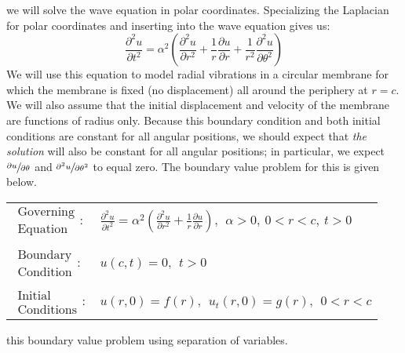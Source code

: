  we will solve the wave equation in polar coordinates.  Specializing the Laplacian for polar coordinates and inserting into the wave equation gives us:
\begin{equation}
\frac{\partial^2 u}{\partial t^2} = \alpha^2 \left(\frac{\partial^2 u}{\partial r^2} + \frac{1}{r}\frac{\partial u}{\partial r} + \frac{1}{r^2}\frac{\partial^2 u}{\partial \theta^2} \right)
\label{eq:lec31-wave-eqn-polar}
\end{equation}
We will use this equation to model radial vibrations in a circular membrane for which the membrane is fixed (no displacement) all around the periphery at $r=c$.  We will also assume that the initial displacement and velocity of the membrane are functions of radius only.  Because this boundary condition and both initial conditions are constant for all angular positions, we should expect that \emph{the solution} will also be constant for all angular positions; in particular, we expect $\sfrac{\partial u}{\partial \theta}$ and $\sfrac{\partial^2 u}{\partial \theta^2}$ to equal zero. The boundary value problem for this is given below.
\begin{table}
\begin{tabular}{l l}
$\substack{\text{Governing} \\\text{Equation}}: $& $\frac{\partial^2 u}{\partial t^2} = \alpha^2 \left(\frac{\partial^2 u}{\partial r^2} + \frac{1}{r}\frac{\partial u}{\partial r}\right), \ \ \alpha > 0, \ 0<r<c, \ t>0$  \\
& \\
$\substack{\text{Boundary} \\ \text{Condition}}: $& $u(c,t) = 0, \ \ t>0$\\
& \\
$\substack{\text{Initial} \\ \text{Conditions}}: $ & $u(r,0) = f(r), \ \ u_{t}(r,0) = g(r), \ \ 0<r<c $ \\
\end{tabular}
\end{table} 

\vspace{0.25cm}

 this boundary value problem using separation of variables.

